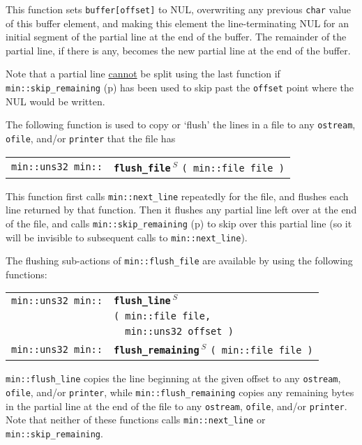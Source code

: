 \documentclass[12pt]{article}
\makeatletter
\newcommand{\ttindex}[1]{\index{#1@{\tt #1}}}
\newcommand{\minindex}[1]{\ttindex{min::#1}\ttindex{#1}}
\newcommand{\pagref}[1]{p\pageref{#1}}
\newcommand{\EOL}{\penalty \exhyphenpenalty}
\newenvironment{indpar}[1][0.3in]%
	{\begin{list}{}%
		     {\setlength{\itemsep}{0in}%
		      \setlength{\topsep}{0in}%
		      \setlength{\parsep}{1ex}%
		      \setlength{\labelwidth}{#1}%
		      \setlength{\leftmargin}{#1}%
		      \addtolength{\leftmargin}{\labelsep}}%
	 \item}%
	{\end{list}}
\newcommand{\LABEL}[1]{\label{#1}}
\newlength{\ARGBREAKLENGTH}
\newcommand{\ARGBREAK}[1][\ARGBREAKLENGTH]{\\&\hspace*{#1}}
\newcommand{\MINKEY}[1]{{\tt \bf #1}\minindex{#1}}
\newcommand{\RESIZE}{$\,^S$}
\makeatother
\begin{document}
This function sets {\tt buffer[offset]} to NUL, overwriting
any previous {\tt char} value of this buffer element, and
making this element the line-terminating NUL for an initial segment
of the partial line at the end of the buffer.  The remainder of
the partial line, if there is any, becomes the new partial line at the
end of the buffer.

Note that a partial line \underline{cannot}\label{SKIP_REMAINING_END_LINE}
be split using the
last function if {\tt min::\EOL skip\_\EOL remaining}
(\pagref{MIN::SKIP_REMAINING}) has been used to skip past the
{\tt offset} point where the NUL would be written.

The following function is used to copy or `flush' the lines in a file
to any {\tt ostream}, {\tt ofile}, and/or {\tt printer}
that the file has

\begin{indpar}[1em]\begin{tabular}{r@{}l}
\verb|min::uns32 min::|
    & \MINKEY{flush\_\EOL file\RESIZE} \verb|( min::file file )|
\LABEL{MIN::FLUSH_FILE} \\
\end{tabular}\end{indpar}

This function first calls {\tt min::next\_line} repeatedly
for the file, and flushes each line returned by that function.
Then it flushes any partial line left over at the end of the
file, and calls {\tt min::\EOL skip\_\EOL remaining}
(\pagref{MIN::SKIP_REMAINING}) to skip over this partial line
(so it will be invisible to subsequent calls to
{\tt min::\EOL next\_\EOL line}).

The flushing sub-actions of {\tt min::flush\_file} are available by using
the following functions:

\begin{indpar}[1em]\begin{tabular}{r@{}l}
\verb|min::uns32 min::|
    & \MINKEY{flush\_\EOL line\RESIZE}\ARGBREAK
          \verb|( min::file file,|\ARGBREAK
	  \verb|  min::uns32 offset )|
\LABEL{MIN::FLUSH_LINE} \\
\verb|min::uns32 min::|
    & \MINKEY{flush\_remaining\RESIZE} \verb|( min::file file )|
\LABEL{MIN::FLUSH_REMAINING} \\
\end{tabular}\end{indpar}

{\tt min::flush\_line} copies the line beginning at the given offset
to any {\tt ostream}, {\tt ofile},
and/or {\tt printer},
while {\tt min::\EOL flush\_\EOL remaining} copies any remaining
bytes in the partial line
at the end of the file
to any {\tt ostream}, {\tt ofile}, and/or
{\tt printer}.
Note that neither of these functions calls {\tt min::\EOL next\_\EOL line}
or {\tt min::\EOL skip\_\EOL remaining}.
\end{document}

